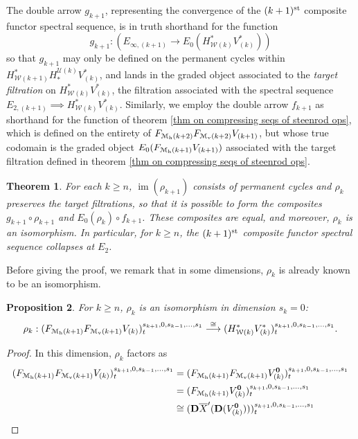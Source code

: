 \documentclass[11pt]{amsart}
\theoremstyle{plain}
\newtheorem{thm}{Theorem}[section]
\newtheorem{prop}[thm]{Proposition}
\theoremstyle{definition}
\DeclareMathOperator{\im}{im}
\renewcommand{\to}{\longrightarrow}
\newcommand{\calU}{\mathcal{U}}
\newcommand{\calM}{\mathcal{M}}
\newcommand{\calw}{\mathcal{W}}
\newcommand{\calMh}{\mathcal{M}_\textup{h}}
\theoremstyle{plain}
\newcommand{\UEAX}{\overline{X}'}%
\newcommand{\dual}{\mathbf{D}}
\begin{document}
\begin{Calculations of HWn for n nonzero}
The double arrow $g_{k+1}$, representing the convergence of the $(k+1)^{\textup{st}}$ composite functor spectral sequence, is in truth shorthand for the function
\[g_{k+1}:\left(E_{\infty,(k+1)}\to E_0(H^*_{\calw(k)}V^*_{(k)})\right)\]
so that $g_{k+1}$ may only be defined on the permanent cycles within $H^*_{\calw(k+1)}H_*^{\calU(k)}V^*_{(k)}$, and lands in the graded object associated to the \emph{target filtration} on $H^*_{\calw(k)}V^*_{(k)}$, the filtration associated with the spectral sequence $E_{2,(k+1)}\implies H^*_{\calw(k)}V^*_{(k)}$. Similarly, we employ the double arrow $f_{k+1}$ as shorthand for the function of theorem \ref{thm on compressing seqs of steenrod ops}, which is defined on the entirety of $F_{\calM_{\textup{h}}(k+2)}F_{\calM_{\textup{v}}(k+2)}V_{(k+1)}$, but whose true codomain is the graded object $E_0(F_{\calMh(k+1)}V_{(k+1)})$ associated with the target filtration defined in theorem \ref{thm on compressing seqs of steenrod ops}.
\begin{thm}\label{thm on collapsing of most sseqs}
For each $k\geq n$, $\im(\rho_{k+1})$ consists of permanent cycles and $\rho_k$ preserves the target filtrations, so that it is possible to form the composites $g_{k+1}\circ \rho_{k+1}$ and $E_0(\rho_{k})\circ f_{k+1}$. These composites are equal, and moreover, $\rho_k$ is an isomorphism. In particular, for $k\geq n$, the  $(k+1)^{\textup{st}}$ composite functor spectral sequence collapses at $E_2$.
\end{thm}
Before giving the proof, we remark that in some dimensions, $\rho_k$ is already known to be an isomorphism.
\begin{prop}\label{isomorphism rho k in some dims}
For $k\geq n$, $\rho_k$ is an isomorphism in dimension $s_k=0$:
\[\rho_k:(F_{\calM_{\textup{h}}(k+1)}F_{\calM_{\textup{v}}(k+1)}V_{(k)})^{s_{k+1},0,s_{k-1},\ldots,s_1}_{t} \overset{\cong}{\to}(H^*_{\calw(k)}V^*_{(k)})^{s_{k+1},0,s_{k-1},\ldots,s_1}_{t}.\]
\end{prop}
\begin{proof}
In this dimension, $\rho_k$ factors as
\begin{alignat*}{2}
(F_{\calM_{\textup{h}}(k+1)}F_{\calM_{\textup{v}}(k+1)}V_{(k)})^{s_{k+1},0,s_{k-1},\ldots,s_1}_{t}
&=
(F_{\calM_{\textup{h}}(k+1)}F_{\calM_{\textup{v}}(k+1)}V_{(k)}^{\textbf{\textup{0}}})^{s_{k+1},0,s_{k-1},\ldots,s_1}_{t}\\
&=(F_{\calM_{\textup{h}}(k+1)}V_{(k)}^{\textbf{\textup{0}}})^{s_{k+1},0,s_{k-1},\ldots,s_1}_{t}\\
&\cong (\dual\UEAX(\dual(V_{(k)}^{\textbf{\textup{0}}})))^{s_{k+1},0,s_{k-1},\ldots,s_1}_{t}\\

\end{alignat*}
\end{proof}
\end{Calculations of HWn for n nonzero}
\end{document}
